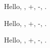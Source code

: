 \documentclass[border=5mm]{standalone}
\begin{document}
\begin{minipage}{20em}
  Hello, , \die+, \die-, .

  \Large
  Hello, , \die+, \die[black]-, .

  \Huge
  Hello, , \die+, \die-, .
\end{minipage}
\end{document}
